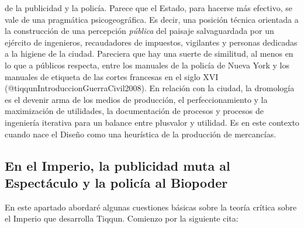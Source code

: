 \documentclass[
]{article}
\begin{document}
de la publicidad y la policía. Parece que el Estado, para hacerse más
efectivo, se vale de una pragmática psicogeográfica. Es decir, una
posición técnica orientada a la construcción de una percepción
\emph{pública} del paisaje salvaguardada por un ejército de ingenieros,
recaudadores de impuestos, vigilantes y personas dedicadas a la higiene
de la ciudad. Pareciera que hay una suerte de similitud, al menos en lo
que a públicos respecta, entre los manuales de la policía de Nueva York
y los manuales de etiqueta de las cortes francesas en el siglo XVI
(@tiqqunIntroduccionGuerraCivil2008). En relación con la ciudad, la
dromología es el devenir arma de los medios de producción, el
perfeccionamiento y la maximización de utilidades, la documentación de
procesos y procesos de ingeniería iterativa para un balance entre
plusvalor y utilidad. Es en este contexto cuando nace el Diseño como una
heurística de la producción de mercancías.

\hypertarget{en-el-imperio-la-publicidad-muta-al-espectuxe1culo-y-la-policuxeda-al-biopoder}{%
\subsection{En el Imperio, la publicidad muta al Espectáculo y la
policía al
Biopoder}\label{en-el-imperio-la-publicidad-muta-al-espectuxe1culo-y-la-policuxeda-al-biopoder}}

En este apartado abordaré algunas cuestiones básicas sobre la teoría
crítica sobre el Imperio que desarrolla Tiqqun. Comienzo por la
siguiente cita:
\end{document}
